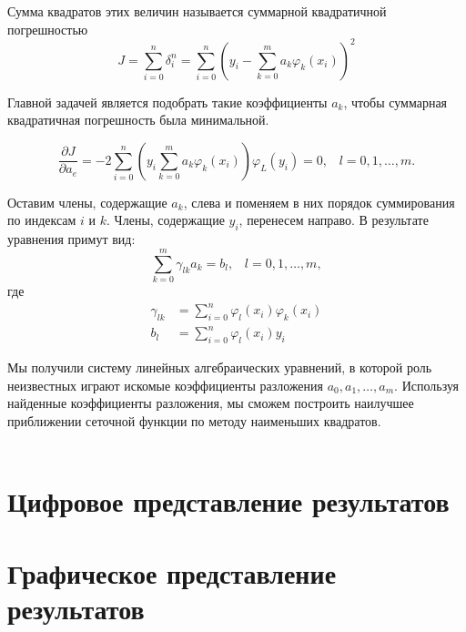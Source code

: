 \documentclass[a4paper, 14pt]{extreport}
\begin{document}
Сумма квадратов этих величин называется суммарной квадратичной погрешностью
$$J=\sum_{i=0}^{n} \delta_{i}^{n}=\sum_{i=0}^{n}\left(y_{i}-\sum_{k=0}^{m} a_{k} \varphi_{k}\left(x_{i}\right)\right)^{2}
$$

Главной задачей является подобрать такие коэффициенты $a_{k}$, чтобы суммарная квадратичная погрешность была минимальной.
\\ 

$$\frac{\partial J}{\partial a_{e}}=-2 \sum_{i=0}^{n}\left(y_{i} \sum_{k=0}^{m} a_{k} \varphi_{k}\left(x_{i}\right)\right) \varphi_{L}\left(y_{i}\right)=0, \; \; \; l = 0, 1, \ldots, m.$$

Оставим члены, содержащие $a_{k}$, слева и поменяем в них порядок суммирования по индексам $i$ и $k$. Члены, содержащие $y_{i}$, перенесем направо. В результате уравнения примут вид:
$$\sum_{k=0}^{m} \gamma_{l k} a_{k}=b_{l}, \; \; \; l=0,1, \ldots, m,$$ где
$$\begin{aligned} \gamma_{l k} &=\sum_{i=0}^{n} \varphi_{l}\left(x_{i}\right) \varphi_{k}\left(x_{i}\right) \\ b_{l} &=\sum_{i=0}^{n} \varphi_{l}(x_{i}) y_{i} \end{aligned}$$

Мы получили систему линейных алгебраических уравнений, в которой роль неизвестных играют искомые коэффициенты разложения $a_{0}, a_{1}, \ldots, a_{m}$. Используя найденные коэффициенты разложения, мы сможем построить наилучшее приближении сеточной функции по методу наименьших квадратов.
\\ \\ 

\section*{Цифровое представление результатов}

\section*{Графическое представление результатов}
\end{document}
